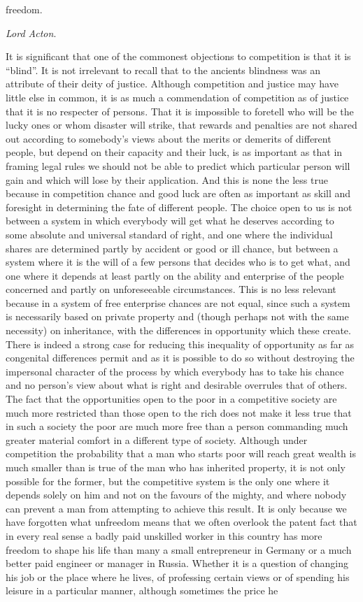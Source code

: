 \documentclass[11pt,openany]{book}
\begin{document}
freedom.

\emph{Lord Acton}.

It is significant that one of the commonest objections to competition is that it is ``blind''. It is not irrelevant to recall that to the ancients blindness was an attribute of their deity of justice. Although competition and justice may have little else in common, it is as much a commendation of competition as of justice that it is no respecter of persons. That it is impossible to foretell who will be the lucky ones or whom disaster will strike, that rewards and penalties are not shared out according to somebody's views about the merits or demerits of different people, but depend on their capacity and their luck, is as important as that in framing legal rules we should not be able to predict which particular person will gain and which will lose by their application. And this is none the less true because in competition chance and good luck are often as important as skill and foresight in determining the fate of different people. The choice open to us is not between a system in which everybody will get what he deserves according to some absolute and universal standard of right, and one where the individual shares are determined partly by accident or good or ill chance, but between a system where it is the will of a few persons that decides who is to get what, and one where it depends at least partly on the ability and enterprise of the people concerned and partly on unforeseeable circumstances. This is no less relevant because in a system of free enterprise chances are not equal, since such a system is necessarily based on private property and (though perhaps not with the same necessity) on inheritance, with the differences in opportunity which these create. There is indeed a strong case for reducing this inequality of opportunity as far as congenital differences permit and as it is possible to do so without destroying the impersonal character of the process by which everybody has to take his chance and no person's view about what is right and desirable overrules that of others. The fact that the opportunities open to the poor in a competitive society are much more restricted than those open to the rich does not make it less true that in such a society the poor are much more free than a person commanding much greater material comfort in a different type of society. Although under competition the probability that a man who starts poor will reach great wealth is much smaller than is true of the man who has inherited property, it is not only possible for the former, but the competitive system is the only one where it depends solely on him and not on the favours of the mighty, and where nobody can prevent a man from attempting to achieve this result. It is only because we have forgotten what unfreedom means that we often overlook the patent fact that in every real sense a badly paid unskilled worker in this country has more freedom to shape his life than many a small entrepreneur in Germany or a much better paid engineer or manager in Russia. Whether it is a question of changing his job or the place where he lives, of professing certain views or of spending his leisure in a particular manner, although sometimes the price he 
\end{document}
